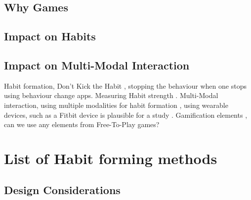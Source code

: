 \subsection{Why Games}

\subsection{Impact on Habits}

\subsection{Impact on Multi-Modal Interaction}


Habit formation, Don't Kick the Habit \cite{article_dont_kick_habit}, stopping the behaviour when one stops using behaviour change apps.\newline
Measuring Habit strength \cite{article_habit_strength} \cite{article_habit_measurement}.\newline
\newline
Multi-Modal interaction, using multiple modalities for habit formation \cite{}, using wearable devices, such as a Fitbit device is plausible for a study \cite{article_wearable_good}.\newline
\newline
Gamification elements \cite{f2p_games_how_to}, can we use any elements from Free-To-Play games?\newline
\newline



\newpage
\section{List of Habit forming methods}

\subsection{Design Considerations}

